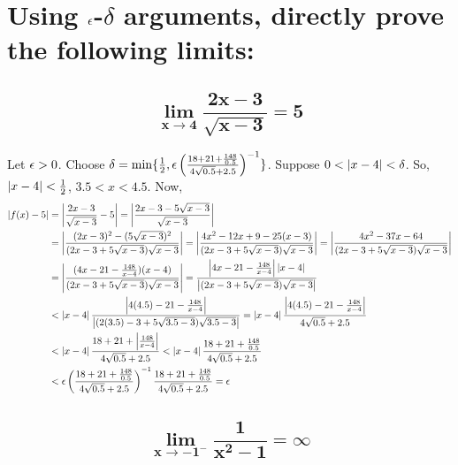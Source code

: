 \section{Using $\epsilon$-$\delta$ arguments, directly prove the following limits:}
    \subsection{
        \[
            \bm{\lim_{x\to 4} \frac{2x-3}{\sqrt{x-3}} = 5}
        \]
    }
        Let $\epsilon > 0$. 
        Choose $\delta = \min\{ \frac{1}{2}, \epsilon \left(\frac{18 + 21 + \frac{148}{0.5}}{4\sqrt{0.5} + 2.5}\right)^{-1} \}$.
        Suppose $0<\left|x - 4\right| < \delta$.
        So, 
        $\left|x - 4\right| < \frac{1}{2} $,
        $3.5 < x < 4.5$.
        Now, 
        \begin{align*}
            \left|f(x) - 5\right|
            &= \left|\frac{2x-3}{\sqrt{x-3}} - 5\right|
            = \left|\frac{2x-3 - 5\sqrt{x-3}}{\sqrt{x-3}}\right| \\
            &= \left|\frac{(2x-3)^2 - (5\sqrt{x-3})^2}{(2x-3 + 5\sqrt{x-3})\sqrt{x-3}}\right| 
            = \left|\frac{4x^2 - 12x + 9 - 25(x-3)}{(2x-3 + 5\sqrt{x-3})\sqrt{x-3}}\right| 
            = \left|\frac{4x^2 - 37x -64}{(2x-3 + 5\sqrt{x-3})\sqrt{x-3}}\right| \\
            &= \left|\frac{(4x - 21 - \frac{148}{x-4})(x-4)}{(2x-3 + 5\sqrt{x-3})\sqrt{x-3}}\right| 
            = \frac{\left|4x - 21 - \frac{148}{x-4}\right|\left|x-4\right|}{\left|(2x-3 + 5\sqrt{x-3})\sqrt{x-3}\right|} \\
            &< \left|x-4\right| \frac{\left|4(4.5) - 21 - 
                \frac{148}{x-4}\right|}{\left|(2(3.5)-3 + 5\sqrt{3.5-3})\sqrt{3.5-3}\right|} 
            = \left|x-4\right| \frac{\left|4(4.5) - 21 - \frac{148}{x-4}\right|}{4\sqrt{0.5} + 2.5} \\
            &< \left|x-4\right| \frac{18 + 21 + \left|\frac{148}{x-4}\right|}{4\sqrt{0.5} + 2.5} 
            < \left|x-4\right| \frac{18 + 21 + \frac{148}{0.5}}{4\sqrt{0.5} + 2.5} \\
            &< \epsilon \left(\frac{18 + 21 + \frac{148}{0.5}}{4\sqrt{0.5} + 2.5}\right)^{-1}
                \frac{18 + 21 + \frac{148}{0.5}}{4\sqrt{0.5} + 2.5}
            = \epsilon
        \end{align*}

    \subsection{
        \[
            \bm{\lim_{x\to -1^-}\frac{1}{x^2-1} = \infty}
        \]
    }

